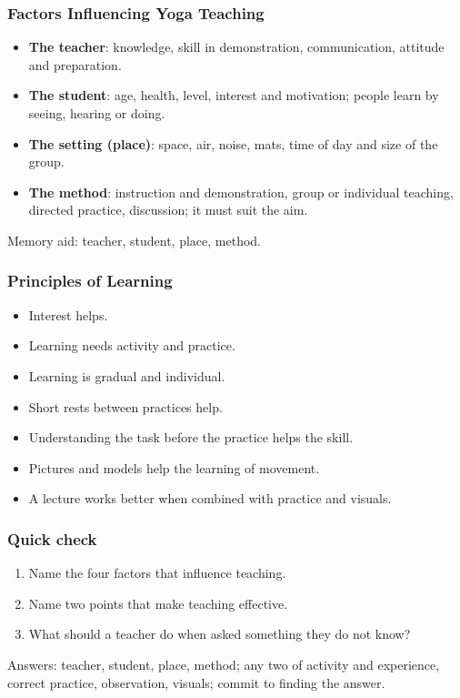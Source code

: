 \begin{frame}[fragile]\frametitle{Factors Influencing Yoga Teaching}

    \begin{itemize}
        \item \textbf{The teacher}: knowledge, skill in demonstration, communication, attitude and preparation.
        \item \textbf{The student}: age, health, level, interest and motivation; people learn by seeing, hearing or doing.
        \item \textbf{The setting (place)}: space, air, noise, mats, time of day and size of the group.
        \item \textbf{The method}: instruction and demonstration, group or individual teaching, directed practice, discussion; it must suit the aim.
    \end{itemize}
    Memory aid: teacher, student, place, method.

\end{frame}

\begin{frame}[fragile]\frametitle{Principles of Learning}

    \begin{itemize}
        \item Interest helps.
        \item Learning needs activity and practice.
        \item Learning is gradual and individual.
        \item Short rests between practices help.
        \item Understanding the task before the practice helps the skill.
        \item Pictures and models help the learning of movement.
        \item A lecture works better when combined with practice and visuals.
    \end{itemize}

\end{frame}

\begin{frame}[fragile]\frametitle{Quick check}

    \begin{enumerate}
        \item Name the four factors that influence teaching.
        \item Name two points that make teaching effective.
        \item What should a teacher do when asked something they do not know?
    \end{enumerate}
    {\small Answers: teacher, student, place, method; any two of activity and experience, correct practice, observation, visuals; commit to finding the answer.}

\end{frame}


